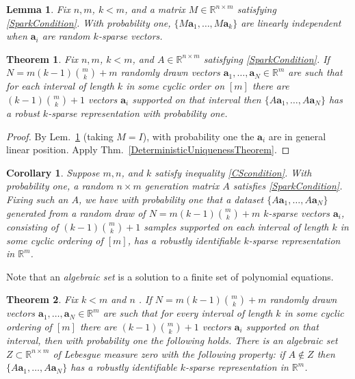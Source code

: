 \documentclass[journal, twocolumn]{IEEEtran}
\newtheorem{theorem}{Theorem}
\newtheorem{lemma}{Lemma}
\newtheorem{corollary}{Corollary}
\begin{document}
\begin{lemma}\label{Hillar15lemma2}
Fix $n, m$, $k < m$, and a matrix $M \in \mathbb{R}^{n \times m}$ satisfying \eqref{SparkCondition}. With probability one, $\{M\mathbf{a}_1, \ldots, M\mathbf{a}_k\}$ are linearly independent when $\mathbf{a}_i$ are random $k$-sparse vectors.
\end{lemma}

\begin{theorem}\label{Theorem2}
Fix $n, m$, $k < m$, and $A \in \mathbb{R}^{n \times m}$ satisfying \eqref{SparkCondition}. If  $N = m(k-1){m \choose k}+m$ randomly drawn vectors $\mathbf{a}_1, \ldots, \mathbf{a}_N \in \mathbb{R}^m$ are such that for each interval of length $k$ in some cyclic order on $[m]$ there are $(k-1){m \choose k} + 1$ vectors $\mathbf{a}_i$ supported on that interval then $\{A\mathbf{a}_1, \ldots, A\mathbf{a}_N\}$ has a robust  $k$-sparse representation with probability one.
\end{theorem}

\begin{proof}
By Lem.~\ref{Hillar15lemma2} (taking $M = I$), with probability one the $\mathbf{a}_i$ are in general linear position. Apply Thm.~\ref{DeterministicUniquenessTheorem}.
\end{proof} 

\begin{corollary}
Suppose $m, n$, and $k$ satisfy inequality \eqref{CScondition}. With probability one, a random $n \times m$ generation matrix $A$ satisfies \eqref{SparkCondition}. Fixing such an $A$, we have with probability one that a dataset $\{A\mathbf{a}_1, \ldots , A\mathbf{a}_N\}$ generated from a random draw of $N = m(k-1){m \choose k}+m$ $k$-sparse vectors $\mathbf{a}_i$, consisting of $(k-1){m \choose k}+1$ samples supported on each interval of length $k$ in some cyclic ordering of $[m]$, has a robustly identifiable $k$-sparse representation in $\mathbb{R}^m$.
\end{corollary}

Note that an \emph{algebraic set} is a solution to a finite set of polynomial equations. 

\begin{theorem}\label{Theorem3}
Fix $k < m$ and $n$ . If $N = m(k-1){m \choose k}+m$ randomly drawn vectors $\mathbf{a}_1, \ldots, \mathbf{a}_N \in \mathbb{R}^m$ are such that for every interval of length $k$ in some cyclic ordering of $[m]$ there are $(k-1){m \choose k}+1$ vectors $\mathbf{a}_i$ supported on that interval, then with probability one the following holds. There is an algebraic set $Z \subset \mathbb{R}^{n \times m}$ of Lebesgue measure zero with the following property: if $A \notin Z$ then $\{A\mathbf{a}_1, \ldots , A\mathbf{a}_N \}$ has a robustly identifiable $k$-sparse representation in $\mathbb{R}^m$.
\end{theorem}
\end{document}
